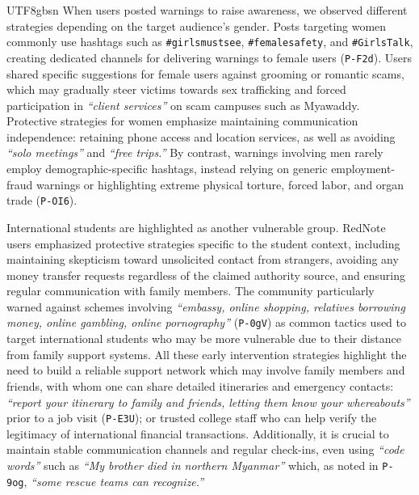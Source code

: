\documentclass[sigconf,nonacm]{acmart}
\newcommand{\add}[1]{#1}
\begin{document}
\begin{CJK}{UTF8}{gbsn}
\add{When users posted warnings to raise awareness, we observed different strategies depending on the target audience's gender. 
Posts targeting women commonly use hashtags such as \texttt{\#girlsmustsee}, \texttt{\#femalesafety}, and \texttt{\#GirlsTalk}, creating dedicated channels for delivering warnings to  female users (\texttt{P-F2d}).} \add{Users shared} specific suggestions for female users against grooming or romantic scams, which may gradually steer victims towards sex trafficking and forced participation in \textit{``client services''} on scam campuses such as Myawaddy. Protective strategies for women emphasize maintaining communication independence: retaining phone access and location services, as well as avoiding \textit{``solo meetings''} and \textit{``free trips.''} \add{By contrast, warnings involving men rarely employ demographic-specific hashtags, instead relying on generic employment-fraud warnings or highlighting extreme physical torture, forced labor, and organ trade (\texttt{P-OI6}).}

International students are highlighted as another vulnerable group. RedNote users emphasized protective strategies specific to the student context, including maintaining skepticism toward unsolicited contact from strangers, avoiding any money transfer requests regardless of the claimed authority source, and ensuring regular communication with family members. The community particularly warned against schemes involving \textit{``embassy, online shopping, relatives borrowing money, online gambling, online pornography''} (\texttt{P-0gV}) as common tactics used to target international students who may be more vulnerable due to their distance from family support systems. All these early intervention strategies highlight the need to build a reliable support network which may involve family members and friends, with whom one can share detailed itineraries and emergency contacts: \textit{``report your itinerary to family and friends, letting them know your whereabouts''} prior to a job visit (\texttt{P-E3U}); or trusted college staff who can help verify the legitimacy of international financial transactions. Additionally, it is crucial to maintain stable communication channels and regular check-ins, even using \textit{``code words''} such as \textit{``My brother died in northern Myanmar''} which, as noted in \texttt{P-9og}, \textit{``some rescue teams can recognize.''}


\end{CJK}
\end{document}
